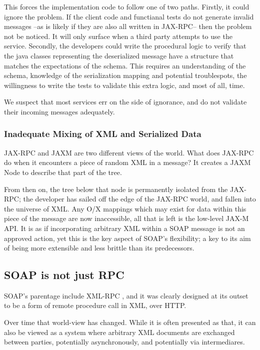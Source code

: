 This forces the implementation code to follow one of two paths.
Firstly, it could ignore the problem. If the client code and functianal
tests do not generate invalid messages --as is likely if they are also
all written in JAX-RPC-- then the problem not be noticed. It will only
surface when a third party attempts to use the service.
Secondly, the developers could write the procedural logic to verify that
the java classes representing the deserialized message have a structure
that matches the expectations of the schema. This requires an
understanding of the schema, knowledge of the serialization mapping and
potential troublespots,  the willingness to write the tests to validate
this extra logic, and most of all, time. 

We suspect that most services err on the side of ignorance, and do not
validate their incoming messages adequately.


\subsubsection{Inadequate Mixing of XML and Serialized Data}
\label{objections:o-x:mixing}

JAX-RPC and JAXM are two different views of the world. What does JAX-RPC
do when it encounters a piece of random XML in a message? It creates a
JAXM Node to describe that part of the tree.

From then on, the tree below that node is permanently isolated from the
JAX-RPC; the developer has sailed off the edge of the JAX-RPC world, and
fallen into the universe of XML. Any O/X mappings which may exist for data
within this piece of the message are now inaccessible, all that is left
is the low-level JAX-M API. It is as if incorporating arbitrary XML
within a SOAP message is not an approved action, yet this is the key
aspect of SOAP's flexibility; a key to its aim of being more extensible
and less brittle than its predecessors.

\subsection{SOAP is not just RPC}
\label{objections:soap-not-just-rmi}

SOAP's parentage include XML-RPC \cite{winer:xmlrpc}, and it
was clearly designed at its outset to be a form of remote procedure call
in XML, over HTTP.

Over time that world-view has changed. While it is often presented as
that, it can also be viewed as a system where arbitrary XML documents
are exchanged between parties, potentially asynchronously, and potentially
via intermediares. 

